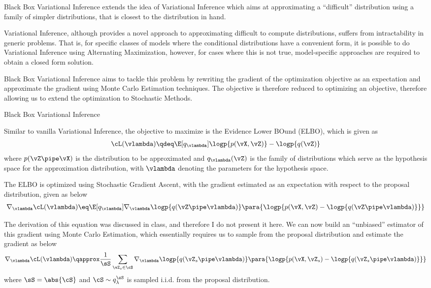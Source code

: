 \documentclass{article}
\begin{document}
\begin{question}

	Black Box Variational Inference extends the idea of Variational Inference \cite{vb1, vb2} which aims at approximating a ``difficult'' distribution using a family of simpler distributions, that is closest to the distribution in hand. 

	Variational Inference, although provides a novel approach to approximating difficult to compute distributions, suffers from intractability in generic problems. That is, for specific classes of models where the conditional distributions have a convenient form, it is possible to do Variational Inference using Alternating Maximization, however, for cases where this is not true, model-specific approaches are required to obtain a closed form solution.

	Black Box Variational Inference aims to tackle this problem by rewriting the gradient of the optimization objective as an expectation and approximate the gradient using Monte Carlo Estimation techniques. The objective is therefore reduced to optimizing an objective, therefore allowing us to extend the optimization to Stochastic Methods.

	\begin{qsection}{Black Box Variational Inference}

		Similar to vanilla Variational Inference, the objective to maximize is the Evidence Lower BOund (ELBO), which is given as
		\begin{align*}
			\cL(\vlambda) \qdeq \E[q_{\vlambda}]{\logp{p(\vX, \vZ)} - \logp{q(\vZ)}}
		\end{align*}
		where $p(\vZ \pipe \vX)$ is the distribution to be approximated and $q_{\vlambda}(\vZ)$ is the family of distributions which serve as the hypothesis space for the approximation distribution, with $\vlambda$ denoting the parameters for the hypothesis space.

		The ELBO is optimized using Stochastic Gradient Ascent, with the gradient estimated as an expectation with respect to the proposal distribution, given as below
		\begin{align*}
			\nabla_{\vlambda} \cL(\vlambda) \eq \E[q_{\vlambda}]{\nabla_{\vlambda} \logp{q(\vZ \pipe \vlambda)} \para{\logp{p(\vX, \vZ) - \logp{q(\vZ \pipe \vlambda)}}}}
		\end{align*}

		The derivation of this equation was discussed in class, and therefore I do not present it here. We can now build an ``unbiased'' estimator of this gradient using Monte Carlo Estimation, which essentially requires us to sample from the proposal distribution and estimate the gradient as below
		\begin{align*}
			\nabla_{\vlambda} \cL(\vlambda) \qapprox \frac{1}{\sS} \sum_{\vZ_s \in \cS} {\nabla_{\vlambda} \logp{q(\vZ_s \pipe \vlambda)} \para{\logp{p(\vX, \vZ_s) - \logp{q(\vZ_s \pipe \vlambda)}}}}
		\end{align*}
		where $\sS = \abs{\cS}$ and $\cS \sim q_{\lambda}^{\sS}$ is sampled i.i.d. from the proposal distribution.


\end{qsection}
\end{question}
\end{document}
